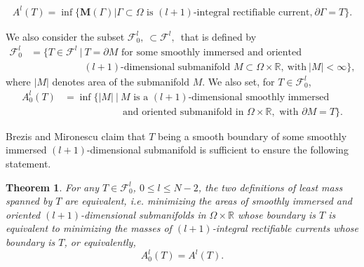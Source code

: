\documentclass{amsart}
\numberwithin{equation}{section}
\newtheorem{theorem}{Theorem}[section]
\theoremstyle{definition}
\theoremstyle{remark}
\newcommand{\R}{\mathbb{R}}
\begin{document}
\begin{align}\label{mass1} A^l(T)= \inf \Big\{\mathbf{M}(\Gamma)\Big|
\Gamma \subset \Omega \text{ is } (l+1)\text{-integral rectifiable current,}\ \partial\Gamma = T \Big\}.
\end{align}

We also consider the subset $\mathcal{F}_0^l,\  \subset \mathcal{F}^l,$\  {that is defined by}
\begin{align*}
\mathcal{F}_0^l &= \Big\{T\in \mathcal{F}^l \ \Big|\ T = \partial M \text{ for some smoothly immersed and oriented}\\
& \qquad\qquad\quad\ \ (l+1)\text{-dimensional submanifold } M {\subset \Omega\times \R},\ \text{with}\  |M|<\infty \Big\},
\end{align*}
{{where $\big|M\big|$ denotes area of the submanifold $M$}}. We also set, for $T \in \mathcal{F}_0^l$,\\
\begin{align}\label{mass2}
A_0^l(T) &= \inf \Big\{ \big|M\big|\ \Big|\ M \text{ is a } (l+1)\text{-dimensional smoothly immersed}\\
& \qquad\qquad\qquad\text{and oriented submanifold in } \Omega\times \R,
\text{ with } \partial M = T \Big\}.\nonumber
\end{align}

Brezis and Mironescu \cite{Brezis-Mironescu} 
claim that $T$ being a smooth boundary of some smoothly immersed {$(l+1)$-dimensional}
submanifold is  sufficient to ensure the following statement. 

\begin{theorem} \label{equal} {\it For any $T \in \mathcal{F}_0^l$, $0\le l\le N-2$, the two definitions of  least mass spanned by $T$ are equivalent, i.e. minimizing the areas of smoothly immersed and oriented  $(l+1)$-dimensional submanifolds in $\Omega\times \R$ whose boundary is $T$ is equivalent to minimizing the masses of {$(l+1)$-}integral rectifiable currents whose boundary is $T$, {or equivalently},
 \[
 A_0^l(T) = A^l(T).
 \]}
 \end{theorem}
 
\end{document}
